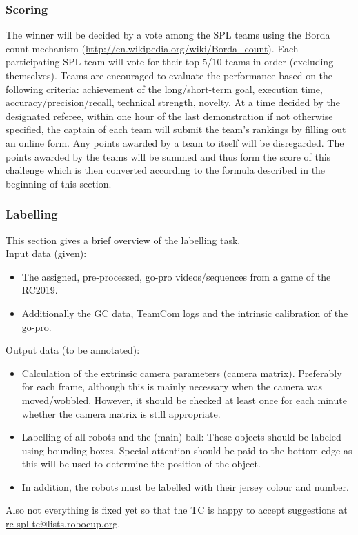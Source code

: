     \subsubsection{Scoring}
    The winner will be decided by a vote among the SPL teams using the Borda count mechanism (\url{http://en.wikipedia.org/wiki/Borda_count}). Each participating SPL team will vote for their top 5/10 teams in order (excluding themselves). Teams are encouraged to evaluate the performance based on the following criteria: achievement of the long/short-term goal, execution time, accuracy/precision/recall, technical strength, novelty. At a time decided by the designated referee, within one hour of the last demonstration if not otherwise specified, the captain of each team will submit the team's rankings by filling out an online form. Any points awarded by a team to itself will be disregarded. The points awarded by the teams will be summed and thus form the score of this challenge which is then converted according to the formula described in the beginning of this section.

    \subsubsection{Labelling}
    This section gives a brief overview of the labelling task.\\

    Input data (given):
    \begin{itemize}
        \item The assigned, pre-processed, go-pro videos/sequences from a game of the RC2019.
        \item Additionally the GC data, TeamCom logs and the intrinsic calibration of the go-pro.
    \end{itemize}

    Output data (to be annotated):
    \begin{itemize}
        \item Calculation of the extrinsic camera parameters (camera matrix). Preferably for each frame, although this is mainly necessary when the camera was moved/wobbled. However, it should be checked at least once for each minute whether the camera matrix is still appropriate.
        \item Labelling of all robots and the (main) ball: These objects should be labeled using bounding boxes. Special attention should be paid to the bottom edge as this will be used to determine the position of the object.
        \item In addition, the robots must be labelled with their jersey colour and number.
    \end{itemize}
    Also not everything is fixed yet so that the TC is happy to accept suggestions at \url{rc-spl-tc@lists.robocup.org}.
